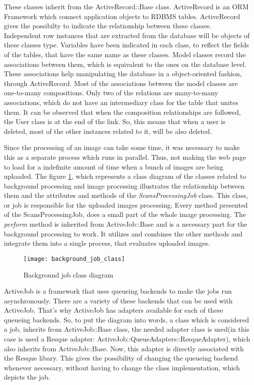 These classes inherit from the ActiveRecord::Base class. ActiveRecord is an ORM Framework which connect application objects to RDBMS tables. ActiveRecord gives the possibilty to indicate the relationship between these classes. Independent row instances that are extracted from the database will be objects of these classes type. Variables have been indicated in each class, to reflect the fields of the tables, that have the same name as these classes. Model classes record the associations between them, which is equivalent to the ones on the database level. These associations help manipulating the database in a object-oriented fashion, through ActiveRecord. Most of the associations between the model classes are one-to-many compositions. Only two of the relations are many-to-many associations, which do not have an intermediary class for the table that unites them. It can be observed that when the composition relationships are followed, the User class is at the end of the link. So, this means that when a user is deleted, most of the other instances related to it, will be also deleted. 

Since the processing of an image can take some time, it was necessary to make this as a separate process which runs in parallel. Thus, not making the web page to load for a indefinite amount of time when a bunch of images are being uploaded. The figure \ref{job_class}, which represents a class diagram of the classes related to background processing and image processing illustrates the relationship between them and the attributes and methods of the \textit{ScansProcessingJob} class. This class, or job is responsible for the uploaded images processing. Every method presented of the ScansProcessingJob, does a small part of the whole image processing. The \textit{perform} method is inherited from ActiveJob::Base and is a necessary part for the background processing to work. It utilizes and combines the other methods and integrate them into a single process, that evaluates uploaded images. 

\begin{figure}[!ht]
\centering
\texttt{[image: background\_job\_class]}
\caption{Background job class diagram}\label{job_class}
\end{figure}

ActiveJob is a framework that uses queueing backends to make the jobs run asynchronously. There are a variety of these backends that can be used with ActiveJob. That's why ActiveJob has adapters available for each of these queueing backends. So, to put the diagram into words, a class which is considered a job, inherits from ActiveJob::Base class, the needed adapter class is used(in this case is used a Resque adapter: ActiveJob::QueueAdapters::ResqueAdapter), which also inherits from ActiveJob::Base. Now, this adapter is directly associated with the Resque libary. This gives the possibility of changing the queueing backend whenever necessary, without having to change the class implementation, which depicts the job. 


